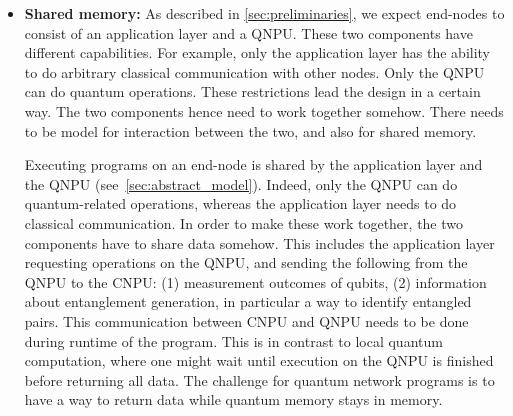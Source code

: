 \begin{itemize}
      \item \label{item:design_return} \textbf{Shared memory:}
            As described in \cref{sec:preliminaries}, we expect end-nodes to consist of an application layer and a \ac{QNPU}.
            These two components have different capabilities.
            For example, only the application layer has the ability to do arbitrary classical communication with other nodes.
            Only the \ac{QNPU} can do quantum operations.
            These restrictions lead the design in a certain way.
            The two components hence need to work together somehow.
            There needs to be model for interaction between the two, and also for shared memory.

            Executing programs on an end-node is shared by the application layer and the \ac{QNPU} (see~\cref{sec:abstract_model}).
            Indeed, only the \ac{QNPU} can do quantum-related operations, whereas the application layer needs to do classical communication.
            In order to make these work together, the two components have to share data somehow.
            This includes the application layer requesting operations on the \ac{QNPU}, and sending the following from the \ac{QNPU} to the \ac{CNPU}:
                (1) measurement outcomes of qubits,
                (2) information about entanglement generation, in particular a way to identify entangled pairs.
            This communication between \ac{CNPU} and \ac{QNPU} needs to be done during runtime of the program.
            This is in contrast to local quantum computation, where one might wait until execution on the \ac{QNPU} is finished before returning all data.
            The challenge for quantum network programs is to have a way to return data while quantum memory stays in memory.


\end{itemize}
